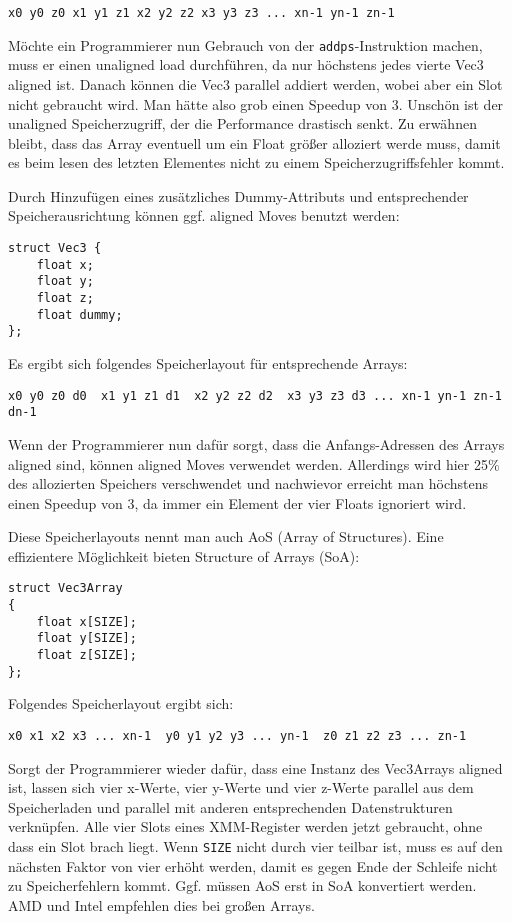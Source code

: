 \documentclass[a4paper,10pt]{article}
\begin{document}
\begin{verbatim}
x0 y0 z0 x1 y1 z1 x2 y2 z2 x3 y3 z3 ... xn-1 yn-1 zn-1
\end{verbatim}

Möchte ein Programmierer nun Gebrauch von der \texttt{addps}-Instruktion machen, muss er einen
unaligned load durchführen, da nur höchstens jedes vierte Vec3 aligned ist. Danach können die Vec3
parallel addiert werden, wobei aber ein Slot nicht gebraucht wird. Man hätte also grob einen Speedup
von 3. Unschön ist der unaligned Speicherzugriff, der die Performance drastisch senkt. Zu erwähnen
bleibt, dass das Array eventuell um ein Float größer alloziert werde muss, damit es beim lesen des
letzten Elementes nicht zu einem Speicherzugriffsfehler kommt.

Durch Hinzufügen eines zusätzliches Dummy-Attributs und entsprechender Speicherausrichtung können
ggf. aligned Moves benutzt werden:

\begin{verbatim}
struct Vec3 {
    float x;
    float y;
    float z;
    float dummy;
};
\end{verbatim}

Es ergibt sich folgendes Speicherlayout für entsprechende Arrays:

\begin{verbatim}
x0 y0 z0 d0  x1 y1 z1 d1  x2 y2 z2 d2  x3 y3 z3 d3 ... xn-1 yn-1 zn-1 dn-1
\end{verbatim}

Wenn der Programmierer nun dafür sorgt, dass die Anfangs-Adressen des Arrays aligned sind, können
aligned Moves verwendet werden. Allerdings wird hier 25\% des allozierten Speichers verschwendet und
nachwievor erreicht man höchstens einen Speedup von 3, da immer ein Element der vier Floats
ignoriert wird.

Diese Speicherlayouts nennt man auch AoS (Array of Structures). Eine effizientere Möglichkeit bieten
Structure of Arrays (SoA):

\begin{verbatim}
struct Vec3Array
{
    float x[SIZE];
    float y[SIZE];
    float z[SIZE];
};
\end{verbatim}

Folgendes Speicherlayout ergibt sich:

\begin{verbatim}
x0 x1 x2 x3 ... xn-1  y0 y1 y2 y3 ... yn-1  z0 z1 z2 z3 ... zn-1
\end{verbatim}

Sorgt der Programmierer wieder dafür, dass eine Instanz des Vec3Arrays aligned ist, lassen sich vier
x-Werte, vier y-Werte und vier z-Werte parallel aus dem Speicherladen und parallel mit anderen
entsprechenden Datenstrukturen verknüpfen. Alle vier Slots eines XMM-Register werden jetzt
gebraucht, ohne dass ein Slot brach liegt. Wenn \texttt{SIZE} nicht durch vier teilbar ist, muss es
auf den nächsten Faktor von vier erhöht werden, damit es gegen Ende der Schleife nicht zu
Speicherfehlern kommt. Ggf. müssen AoS erst in SoA konvertiert werden. AMD und Intel empfehlen dies
bei großen Arrays. 
\end{document}
